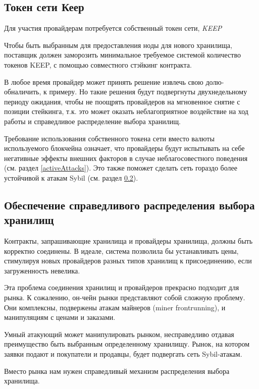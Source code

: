 \documentclass[russian,english,11pt]{article}
\begin{document}
\subsection{Токен сети Кеер}

Для участия провайдерам потребуется собственный токен сети, 
 \textit{KEEP}

Чтобы быть выбранным для предоставления ноды для нового хранилища, 
поставщик должен заморозить минимальное требуемое системой 
количество токенов KEEP, с помощью совместного стэйкинг контракта.

В любое время провайдер может принять решение извлечь свою долю- 
обналичить, к примеру. Но такие решения будут подвергнуты 
двухнедельному периоду ожидания, чтобы не поощрять провайдеров 
на мгновенное снятие с позиции стейкинга, т.к. это может оказать 
неблагоприятное воздействие на ход работы и справедливое 
распределение выбора хранилищ.

Требование использования собственного токена сети вместо валюты 
используемого блокчейна означает, что провайдеры будут испытывать 
на себе негативные эффекты внешних факторов в случае 
неблагосовестного поведения (см. раздел \ref{activeAttacks}). 
Это также поможет сделать сеть гораздо более устойчивой к атакам 
Sybil (см. раздел \ref{fairKeepSelection}).

\subsection{Обеспечение справедливого распределения выбора хранилищ}
\label{fairKeepSelection}

Контракты, запрашивающие хранилища и провайдеры хранилища, должны 
быть корректно соединены. В идеале, система позволила бы 
устанавливать цены, стимулируя новых провайдеров разных типов 
хранилищ к присоединению, если загруженность невелика.

Эта проблема соединения хранилищ и провайдеров прекрасно подходит 
для рынка. К сожалению, он-чейн рынки представляют собой сложную 
проблему. Они комплексны, подвержены атакам майнеров 
(miner frontrunning), и манипуляциям с ценами и заказами. 
  
Умный атакующий может манипулировать рынком, несправедливо отдавая 
преимущество быть выбранным определенному хранилищу. Рынок, на 
котором заявки подают и покупатели и продавцы, будет подвергать 
сеть Sybil-атакам.
  
Вместо рынка нам нужен справедливый механизм распределения выбора 
хранилища.
\end{document}
